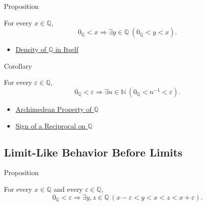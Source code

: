 \begin{propositionbox}{Proposition}
\begin{proposition}
\label{prop:no-least-positive-rational}
For every $x\in\mathbb{Q}$,
\[
0_{\mathbb{Q}}<x
\Longrightarrow
\exists y\in\mathbb{Q}\ (0_{\mathbb{Q}}<y<x).
\]
\end{proposition}
\end{propositionbox}

\begin{dependencies}
\begin{itemize}
  \item \hyperref[thm:density-of-q]{Density of $\mathbb{Q}$ in Itself}
\end{itemize}
\end{dependencies}

\begin{corollarybox}{Corollary}
\begin{corollary}
\label{cor:reciprocals-arbitrarily-small-q}
For every $\varepsilon\in\mathbb{Q}$,
\[
0_{\mathbb{Q}}<\varepsilon
\Longrightarrow
\exists n\in\mathbb{N}\ 
\left(0_{\mathbb{Q}}<n^{-1}<\varepsilon\right).
\]
\end{corollary}
\end{corollarybox}

\begin{dependencies}
\begin{itemize}
  \item \hyperref[thm:archimedean-property-of-q]{Archimedean Property of $\mathbb{Q}$}
  \item \hyperref[thm:sign-of-reciprocal-q]{Sign of a Reciprocal on $\mathbb{Q}$}
\end{itemize}
\end{dependencies}

\subsection*{Limit-Like Behavior Before Limits}

\begin{propositionbox}{Proposition}
\begin{proposition}
\label{prop:one-sided-rational-approximation}
For every $x\in\mathbb{Q}$ and every $\varepsilon\in\mathbb{Q}$,
\[
0_{\mathbb{Q}}<\varepsilon
\Longrightarrow
\exists y,z\in\mathbb{Q}\ (x-\varepsilon<y<x<z<x+\varepsilon).
\]
\end{proposition}
\end{propositionbox}

